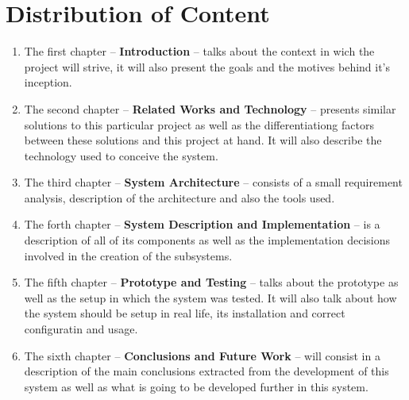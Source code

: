 \section{Distribution of Content}
\label{sec:organ}
\begin{enumerate}
	\item The first chapter -- \textbf{Introduction} -- talks about the context
		in wich the project will strive, it will also present the goals and the
		motives behind it's inception.
	\item The second chapter -- \textbf{Related Works and Technology} --
		presents similar solutions to this particular project as well as the
		differentiationg factors between these solutions and this project at
		hand. It will also describe the technology used to conceive the system.
	\item The third chapter -- \textbf{System Architecture} -- consists of a
		small requirement analysis, description of the architecture and also the
		tools used.
	\item The forth chapter -- \textbf{System Description and Implementation} --
		is a description of all of its components as well as the implementation
		decisions involved in the creation of the subsystems.
	\item The fifth chapter -- \textbf{Prototype and Testing} -- talks about the
		prototype as well as the setup in which the system was tested. It will
		also talk about how the system should be setup in real life, its
		installation and correct configuratin and usage.
	\item The sixth chapter -- \textbf{Conclusions and Future Work} -- will
		consist in a description of the main conclusions extracted from the
		development of this system as well as what is going to be developed
		further in this system.
\end{enumerate}

